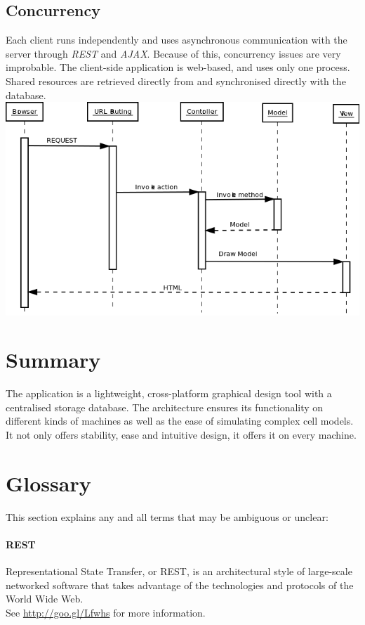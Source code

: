 \documentclass{report}
\begin{document}
		\subsection{Concurrency}
			Each client runs independently and uses asynchronous communication with the server through \emph{REST} and \emph{AJAX}. Because of this, concurrency issues are very improbable. The client-side application is web-based, and uses only one process. Shared resources are retrieved directly from and synchronised directly with the database.\\
			
			\includegraphics[scale=0.5]{SequenceDiagramLife.png} 
	\clearpage
	\section{Summary}
		The application is a lightweight, cross-platform graphical design tool with a centralised storage database. The architecture ensures its functionality on different kinds of machines as well as the ease of simulating complex cell models. It not only offers stability, ease and intuitive design, it offers it on every machine.
	\section{Glossary}
		This section explains any and all terms that may be ambiguous or unclear:
		\paragraph{REST} 
			Representational State Transfer, or REST, is an architectural style of large-scale networked software that takes advantage of the technologies and protocols of the World Wide Web. \\
See \href{http://goo.gl/Lfwhs}{http://goo.gl/Lfwhs} for more information.
\end{document}
